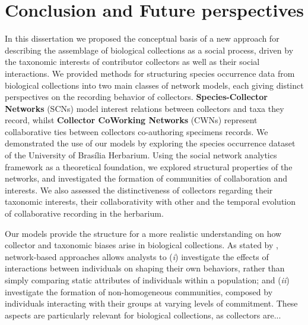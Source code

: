 \chapter{Conclusion and Future perspectives}\label{conclusion_perspectives}


In this dissertation we proposed the conceptual basis of a new approach for describing the assemblage of biological collections as a social process, driven by the taxonomic interests of contributor collectors as well as their social interactions.
We provided methods for structuring species occurrence data from biological collections into two main classes of network models, each giving distinct perspectives on the recording behavior of collectors.
\textbf{Species-Collector Networks} (SCNs) model interest relations between collectors and taxa they record, whilst \textbf{Collector CoWorking Networks} (CWNs) represent collaborative ties between collectors co-authoring specimens records. 
We demonstrated the use of our models by exploring the species occurrence dataset of the University of Brasília Herbarium.
Using the social network analytics framework \cite{Barbier2011,Stork2015} as a theoretical foundation, we explored structural properties of the networks, 
and investigated the formation of communities of collaboration and interests.
We also assessed the distinctiveness of collectors regarding their taxonomic interests, their collaborativity with other and the temporal evolution of collaborative recording in the herbarium.

Our models provide the structure for a more realistic understanding on how collector and taxonomic biases arise in biological collections. 
As stated by , network-based approaches allows analysts to
(\textit{i}) investigate the effects of interactions between individuals on shaping their own behaviors, rather than simply comparing static attributes of individuals within a population; and
(\textit{ii}) investigate the formation of non-homogeneous communities, composed by individuals interacting with their groups at varying levels of commitment.
These aspects are particularly relevant for biological collections, as collectors are...

